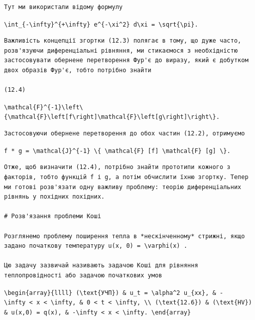 \documentclass[
  ukrainian,
]{article}
\begin{document}
\begin{verbatim}
Тут ми використали відому формулу
\end{verbatim}

\texttt{\textbackslash{}int\_\{-\textbackslash{}infty\}\^{}\{+\textbackslash{}infty\}\ e\^{}\{-\textbackslash{}xi\^{}2\}\ d\textbackslash{}xi\ =\ \textbackslash{}sqrt\{\textbackslash{}pi\}.}

\begin{verbatim}
Важливість концепції згортки (12.3) полягає в тому, що дуже часто, розв'язуючи диференціальні рівняння, ми стикаємося з необхідністю застосовувати обернене перетворення Фур'є до виразу, який є добутком двох образів Фур'є, тобто потрібно знайти

(12.4)
\end{verbatim}

\texttt{\textbackslash{}mathcal\{F\}\^{}\{-1\}\textbackslash{}left\textbackslash{}\{\textbackslash{}mathcal\{F\}\textbackslash{}left{[}f\textbackslash{}right{]}\textbackslash{}mathcal\{F\}\textbackslash{}left{[}g\textbackslash{}right{]}\textbackslash{}right\textbackslash{}\}.}

\begin{verbatim}
Застосовуючи обернене перетворення до обох частин (12.2), отримуємо
\end{verbatim}

\texttt{f\ *\ g\ =\ \textbackslash{}mathcal\{J\}\^{}\{-1\}\ \textbackslash{}\{\ \textbackslash{}mathcal\{F\}\ {[}f{]}\ \textbackslash{}mathcal\{F\}\ {[}g{]}\ \textbackslash{}\}.}

\begin{verbatim}
Отже, щоб визначити (12.4), потрібно знайти прототипи кожного з факторів, тобто функцій f і g, а потім обчислити їхню згортку. Тепер ми готові розв'язати одну важливу проблему: теорію диференціальних рівнянь у похідних похідних.

# Розв'язання проблеми Коші

Розглянемо проблему поширення тепла в *нескінченному* стрижні, якщо задано початкову температуру u(x, 0) = \varphi(x) .

Цю задачу зазвичай називають задачою Коші для рівняння теплопровідності або задачою початкових умов
\end{verbatim}

\texttt{\textbackslash{}begin\{array\}\{llll\}\ (\textbackslash{}text\{УЧП\})\ \&\ u\_t\ =\ \textbackslash{}alpha\^{}2\ u\_\{xx\},\ \&\ -\textbackslash{}infty\ \textless{}\ x\ \textless{}\ \textbackslash{}infty,\ \&\ 0\ \textless{}\ t\ \textless{}\ \textbackslash{}infty,\ \textbackslash{}\textbackslash{}\ (\textbackslash{}text\{12.6\})\ \&\ (\textbackslash{}text\{HV\})\ \&\ u(x,0)\ =\ q(x),\ \&\ -\textbackslash{}infty\ \textless{}\ x\ \textless{}\ \textbackslash{}infty.\ \textbackslash{}end\{array\}}
\end{document}
